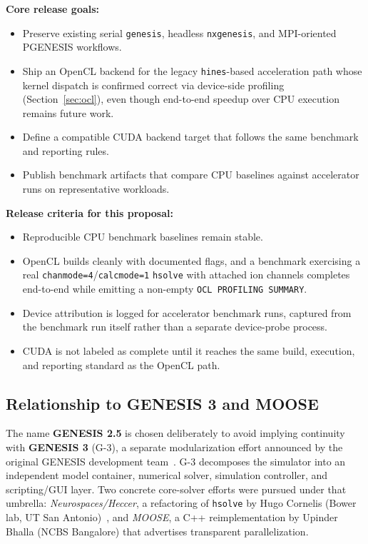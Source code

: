 \documentclass[11pt,a4paper]{article}
\begin{document}
\textbf{Core release goals:}
\begin{itemize}[nosep]
  \item Preserve existing serial \texttt{genesis}, headless \texttt{nxgenesis}, and MPI-oriented PGENESIS workflows.
  \item Ship an OpenCL backend for the legacy \texttt{hines}-based acceleration path whose kernel dispatch is confirmed correct via device-side profiling (Section~\ref{sec:ocl}), even though end-to-end speedup over CPU execution remains future work.
  \item Define a compatible CUDA backend target that follows the same benchmark and reporting rules.
  \item Publish benchmark artifacts that compare CPU baselines against accelerator runs on representative workloads.
\end{itemize}

\textbf{Release criteria for this proposal:}
\begin{itemize}[nosep]
  \item Reproducible CPU benchmark baselines remain stable.
  \item OpenCL builds cleanly with documented flags, and a benchmark exercising a real \texttt{chanmode=4}/\texttt{calcmode=1} \texttt{hsolve} with attached ion channels completes end-to-end while emitting a non-empty \texttt{OCL PROFILING SUMMARY}.
  \item Device attribution is logged for accelerator benchmark runs, captured from the benchmark run itself rather than a separate device-probe process.
  \item CUDA is not labeled as complete until it reaches the same build, execution, and reporting standard as the OpenCL path.
\end{itemize}

\subsection{Relationship to GENESIS 3 and MOOSE}

The name \textbf{GENESIS 2.5} is chosen deliberately to avoid implying continuity with \textbf{GENESIS 3} (G-3), a separate modularization effort announced by the original GENESIS development team~\cite{g3_dev_plans}. G-3 decomposes the simulator into an independent model container, numerical solver, simulation controller, and scripting/GUI layer. Two concrete core-solver efforts were pursued under that umbrella: \textit{Neurospaces/Heccer}, a refactoring of \texttt{hsolve} by Hugo Cornelis (Bower lab, UT San Antonio)~\cite{cornelis2011}, and \textit{MOOSE}, a C++ reimplementation by Upinder Bhalla (NCBS Bangalore) that advertises transparent parallelization.
\end{document}
